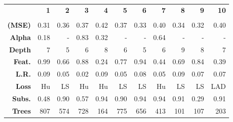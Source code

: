 \setcellgapes{1ex}\makegapedcells\centering\begin{tabular*}{\textwidth}{r|@{\extracolsep{\fill}}rrrrrrrrrr}
\toprule
{} & \textbf{1} & \textbf{2} & \textbf{3} & \textbf{4} & \textbf{5} & \textbf{6} & \textbf{7} & \textbf{8} & \textbf{9} & \textbf{10} \\
      &            &            &            &            &            &            &            &            &            &             \\
\midrule
\textbf{(MSE)} &  0.31 &  0.36 &  0.37 &  0.42 &  0.37 &  0.33 &  0.40 &  0.34 &  0.32 &  0.40 \\
\textbf{Alpha} &  0.18 &  - &  0.83 &  0.32 &  - &  - &  0.64 &  - &  - &  - \\
\textbf{Depth} &  7 &  5 &  6 &  8 &  6 &  5 &  6 &  9 &  8 &  7 \\
\textbf{Feat.} &  0.99 &  0.66 &  0.88 &  0.24 &  0.77 &  0.94 &  0.44 &  0.69 &  0.84 &  0.39 \\
\textbf{L.R. } &  0.09 &  0.05 &  0.02 &  0.09 &  0.05 &  0.08 &  0.05 &  0.09 &  0.07 &  0.07 \\
\textbf{Loss } &  Hu &  LS &  Hu &  Hu &  LS &  LS &  Hu &  LS &  LS &  LAD \\
\textbf{Subs.} &  0.48 &  0.90 &  0.57 &  0.94 &  0.90 &  0.94 &  0.94 &  0.91 &  0.29 &  0.91 \\
\textbf{Trees} &  807 &  574 &  728 &  164 &  775 &  656 &  413 &  101 &  107 &  203 \\
\bottomrule
\end{tabular*}
